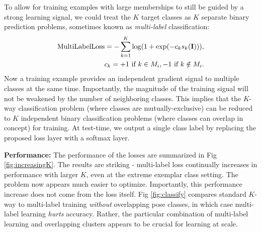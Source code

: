 \documentclass[letterpaper]{article} %
\begin{document}
To allow for training examples with large memberships to still be guided by a strong learning signal, we could treat the $K$ target classes as $K$ separate binary prediction problems, sometimes known as {\em multi-label} classification:
\begin{align}
\label{eq:multilabel}
    \text{MultiLabelLoss} = -\sum_{k = 1}^{K}\log(1 + \exp(-c_k s_k({\bf I}))), \\
    c_k = +1 \text{ if } k \in M_i, -1 \text{ if } k \notin M_i.
\end{align}
Now a training example provides an independent gradient signal to multiple classes at the same time. Importantly, the magnitude of the training signal will not be weakened by the number of neighboring classes. This implies that the $K$-way classification problem (where classes are mutually-exclusive) can be reduced to $K$ independent binary classification problems (where classes can overlap in concept) for training. At test-time, we output a single class label by replacing the proposed loss layer with a softmax layer.

{\bf Performance:} The performance of the losses are summarized in Fig \ref{fig:increasingK}. The results are striking - multi-label loss continually increases in performance with larger $K$, even at the extreme exemplar class setting. The problem now appears much easier to optimize. Importantly, this performance increase does not come from the loss itself. Fig \ref{fig:classify} compares standard $K$-way to multi-label training {\em without} overlapping pose classes, in which case multi-label learning {\em hurts} accuracy. %
Rather, the particular combination of multi-label learning and overlapping clusters appears to be crucial for learning at scale.
\end{document}
